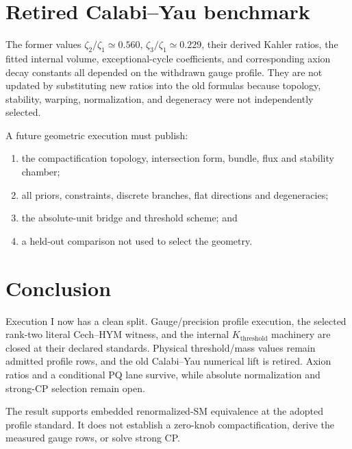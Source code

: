 \documentclass[11pt]{article}
\begin{document}
\section{Retired Calabi--Yau benchmark}

The former values $\zeta_2/\zeta_1\simeq0.560$,
$\zeta_3/\zeta_1\simeq0.229$, their derived Kahler ratios, the fitted internal
volume, exceptional-cycle coefficients, and corresponding axion decay
constants all depended on the withdrawn gauge profile. They are not updated by
substituting new ratios into the old formulas because topology, stability,
warping, normalization, and degeneracy were not independently selected.

A future geometric execution must publish:
\begin{enumerate}
\item the compactification topology, intersection form, bundle, flux and
stability chamber;
\item all priors, constraints, discrete branches, flat directions and
degeneracies;
\item the absolute-unit bridge and threshold scheme; and
\item a held-out comparison not used to select the geometry.
\end{enumerate}

\section{Conclusion}

Execution I now has a clean split. Gauge/precision profile execution, the
selected rank-two literal Cech--HYM witness, and the internal
$K_{\mathrm{threshold}}$ machinery are closed at their declared standards.
Physical threshold/mass values remain admitted profile rows, and the old
Calabi--Yau numerical lift is retired. Axion ratios and a conditional PQ lane
survive, while absolute normalization and strong-CP selection remain open.

The result supports embedded renormalized-SM equivalence at the adopted profile
standard. It does not establish a zero-knob compactification, derive the
measured gauge rows, or solve strong CP.
\end{document}
